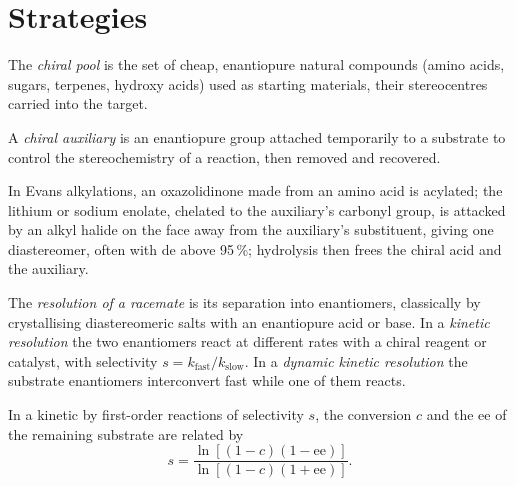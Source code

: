 \section{Strategies}

\begin{definition}\label{def:b3:asymmetric-synthesis:chiral-pool}
The \emph{chiral pool} is the set of cheap, enantiopure
natural compounds (amino acids, sugars, terpenes, hydroxy acids) used as
starting materials, their stereocentres carried into the target.
\end{definition}

\begin{definition}\label{def:b3:asymmetric-synthesis:auxiliary}
A \emph{chiral auxiliary} is an enantiopure group
attached temporarily to a substrate to control the stereochemistry of a
reaction, then removed and recovered.
\end{definition}

In Evans alkylations, an oxazolidinone made from an amino acid is acylated;
the lithium or sodium enolate, chelated to the auxiliary's carbonyl group, is
attacked by an alkyl halide on the face away from the auxiliary's substituent,
giving one diastereomer, often with de above 95\,\%; hydrolysis then frees the
chiral acid and the auxiliary.

\begin{definition}[Resolutions]\label{def:b3:asymmetric-synthesis:resolution}
The \emph{resolution of a racemate} is its
separation into enantiomers, classically by crystallising diastereomeric salts
with an enantiopure acid or base. In a \emph{kinetic resolution} the two enantiomers react at different rates with a chiral reagent or
catalyst, with selectivity $s = k_{\mathrm{fast}}/k_{\mathrm{slow}}$. In a \emph{dynamic kinetic
resolution} the substrate enantiomers
interconvert fast while one of them reacts.
\end{definition}

\begin{theorem}\label{thm:b3:asymmetric-synthesis:kagan}
In a kinetic  by first-order reactions of selectivity $s$,
the conversion $c$ and the ee of the remaining substrate are related by
\[
  s = \frac{\ln[(1 - c)(1 - \mathrm{ee})]}{\ln[(1 - c)(1 + \mathrm{ee})]}.
\]
\end{theorem}

